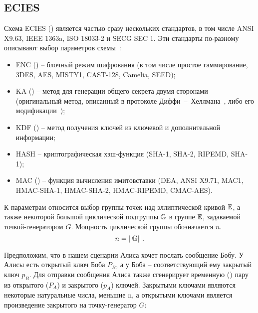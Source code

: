\subsection{ECIES}

Схема ECIES () является частью сразу нескольких стандартов, в том числе ANSI X9.63, IEEE 1363a, ISO 18033-2 и SECG SEC 1. Эти стандарты по-разному описывают выбор параметров схемы~\cite{Martinez:Encinas:Avila:2010}:

\begin{itemize}
	\item ENC () -- блочный режим шифрования (в том числе простое гаммирование, 3DES, AES, MISTY1, CAST-128, Camelia, SEED);
	\item KA () -- метод для генерации общего секрета двумя сторонами (оригинальный метод, описанный в протоколе Диффи~--~Хеллмана~\cite{Diffie:Hellman:1976}, либо его модификации~\cite{Miller:1986});
	\item KDF () -- метод получения ключей из ключевой и дополнительной информации;
	\item HASH -- криптографическая хэш-функция (SHA-1, SHA-2, RIPEMD, SHA-1);
	\item MAC () -- функция вычисления имитовставки (DEA, ANSI X9.71, MAC1, HMAC-SHA-1, HMAC-SHA-2, HMAC-RIPEMD, CMAC-AES).
\end{itemize}

К параметрам относится выбор группы точек над эллиптической кривой $\mathbb{E}$, а также некоторой большой циклической подгруппы $\mathbb{G}$ в группе $\mathbb{E}$, задаваемой точкой-генератором $G$. Мощность циклической группы обозначается $n$.
\[n = \left\| \mathbb{G} \right\|.\]

Предположим, что в нашем сценарии Алиса хочет послать сообщение Бобу. У Алисы есть открытый ключ Боба $P_B$, а у Боба -- соответствующий ему закрытый ключ $p_B$. Для отправки сообщения Алиса также сгенерирует временную () пару из открытого ($P_A$) и закрытого ($p_A$) ключей. Закрытыми ключами являются некоторые натуральные числа, меньшие n, а открытыми ключами является произведение закрытого на точку-генератор $G$:

